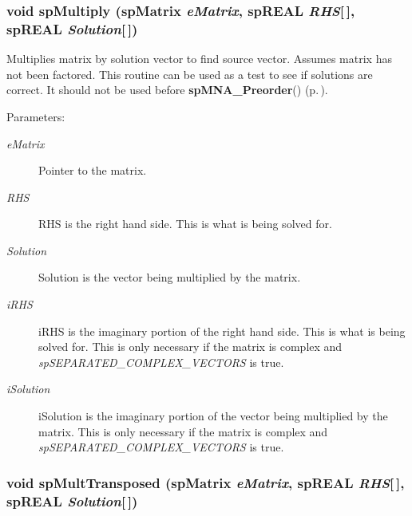 \subsubsection{\setlength{\rightskip}{0pt plus 5cm}void sp\-Multiply ({\bf sp\-Matrix} {\em e\-Matrix}, sp\-REAL {\em RHS}[$\,$], sp\-REAL {\em Solution}[$\,$])}\label{spUtils_8c_a14}


Multiplies matrix by solution vector to find source vector. Assumes matrix has not been factored. This routine can be used as a test to see if solutions are correct. It should not be used before {\bf sp\-MNA\_\-Preorder}() {\rm (p.\,\pageref{spUtils_8c_a11})}.\begin{Desc}
\item[Parameters: ]\par
\begin{description}
\item[{\em 
e\-Matrix}]Pointer to the matrix. \item[{\em 
RHS}]RHS is the right hand side. This is what is being solved for. \item[{\em 
Solution}]Solution is the vector being multiplied by the matrix. \item[{\em 
i\-RHS}]i\-RHS is the imaginary portion of the right hand side. This is what is being solved for. This is only necessary if the matrix is complex and {\em sp\-SEPARATED\_\-COMPLEX\_\-VECTORS} is true. \item[{\em 
i\-Solution}]i\-Solution is the imaginary portion of the vector being multiplied by the matrix. This is only necessary if the matrix is complex and {\em sp\-SEPARATED\_\-COMPLEX\_\-VECTORS} is true. \end{description}
\end{Desc}
\subsubsection{\setlength{\rightskip}{0pt plus 5cm}void sp\-Mult\-Transposed ({\bf sp\-Matrix} {\em e\-Matrix}, sp\-REAL {\em RHS}[$\,$], sp\-REAL {\em Solution}[$\,$])}\label{spUtils_8c_a15}


